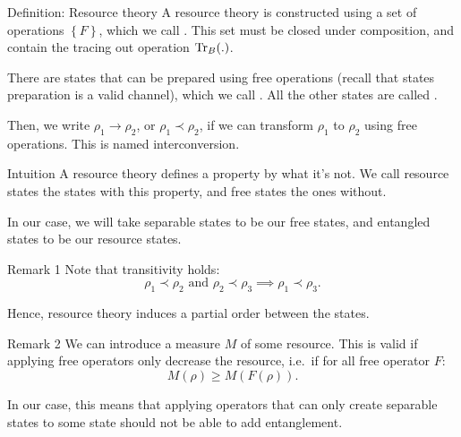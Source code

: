 \documentclass[a4paper]{article}
\begin{document}
\begin{parag}{Definition: Resource theory}
    A resource theory is constructed using a set of operations $\left\{F\right\}$, which we call . This set must be closed under composition, and contain the tracing out operation $\Tr_B\left(.\right)$.

    There are states that can be prepared using free operations (recall that states preparation is a valid channel), which we call . All the other states are called .

    Then, we write $\rho_1 \to \rho_2$, or $\rho_1 \prec \rho_2$, if we can transform $\rho_1$ to $\rho_2$ using free operations. This is named interconversion.

    \begin{subparag}{Intuition}
        A resource theory defines a property by what it's not. We call resource states the states with this property, and free states the ones without.   

        In our case, we will take separable states to be our free states, and entangled states to be our resource states.
    \end{subparag}

    \begin{subparag}{Remark 1}
        Note that transitivity holds: 
        \[\rho_1 \prec \rho_2 \text{ and } \rho_2 \prec \rho_3 \implies \rho_1 \prec \rho_3.\]

        Hence, resource theory induces a partial order between the states.
    \end{subparag}

    \begin{subparag}{Remark 2}
        We can introduce a measure $M$ of some resource. This is valid if applying free operators only decrease the resource, i.e.~if for all free operator $F$: 
        \[M\left(\rho\right) \geq M\left(F\left(\rho\right)\right).\]

        In our case, this means that applying operators that can only create separable states to some state should not be able to add entanglement.
    \end{subparag}
\end{parag}
\end{document}
